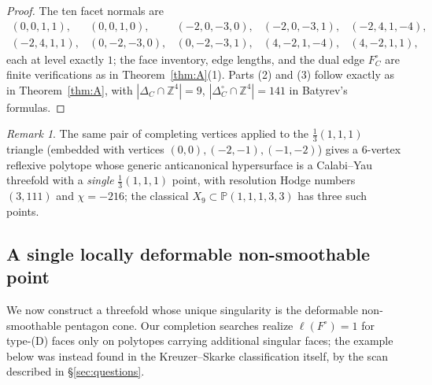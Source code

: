 \documentclass[11pt]{amsart}
\theoremstyle{definition}
\theoremstyle{remark}
\newtheorem{remark}[theorem]{Remark}
\newcommand{\ZZ}{\mathbb{Z}}
\newcommand{\PP}{\mathbb{P}}
\begin{document}
\begin{proof}
The ten facet normals are
\[
\begin{array}{lllll}
(0,0,1,1), & (0,0,1,0), & (-2,0,-3,0), & (-2,0,-3,1), & (-2,4,1,-4),\\[2pt]
(-2,4,1,1), & (0,-2,-3,0), & (0,-2,-3,1), & (4,-2,1,-4), & (4,-2,1,1),
\end{array}
\]
each at level exactly $1$; the face inventory, edge lengths, and the dual
edge $F_C^\circ$
are finite verifications as in Theorem~\ref{thm:A}(1).  Parts (2) and (3)
follow exactly as in Theorem~\ref{thm:A}, with
$|\Delta_C\cap\ZZ^4| = 9$, $|\Delta_C^\circ\cap\ZZ^4| = 141$ in Batyrev's
formulas.
\end{proof}

\begin{remark}
The same pair of completing vertices applied to the $\frac13(1,1,1)$
triangle (embedded with vertices $(0,0),(-2,-1),(-1,-2)$) gives a $6$-vertex
reflexive polytope whose generic anticanonical hypersurface is a Calabi--Yau
threefold with a \emph{single} $\frac13(1,1,1)$ point, with resolution Hodge
numbers $(3,111)$ and $\chi = -216$; the classical
$X_9 \subset \PP(1,1,1,3,3)$ has three such points.
\end{remark}

\subsection{A single locally deformable non-smoothable point}

We now construct a threefold whose unique singularity is the deformable
non-smoothable pentagon cone.  Our completion searches
realize $\ell(F^\circ)=1$ for type-\textup{(D)} faces only on polytopes
carrying additional singular faces; the example below was instead found in
the Kreuzer--Skarke classification itself, by the scan described in
\S\ref{sec:questions}.
\end{document}
